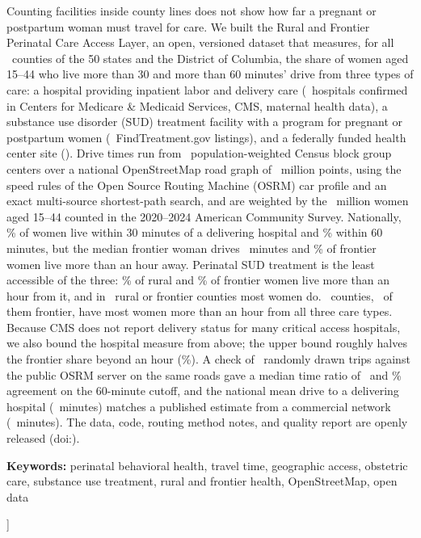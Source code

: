\documentclass[10pt,twocolumn,letterpaper]{article}
\begin{document}
\begin{@twocolumnfalse}
\begin{center}
\begin{minipage}{0.82\textwidth}
Counting facilities inside county lines does not show how far a pregnant or postpartum woman must travel for care. We built the Rural and Frontier Perinatal Care Access Layer, an open, versioned dataset that measures, for all \NCounties\ counties of the 50 states and the District of Columbia, the share of women aged 15--44 who live more than 30 and more than 60 minutes' drive from three types of care: a hospital providing inpatient labor and delivery care (\SitesOB\ hospitals confirmed in Centers for Medicare \& Medicaid Services, CMS, maternal health data), a substance use disorder (SUD) treatment facility with a program for pregnant or postpartum women (\SitesPPW\ FindTreatment.gov listings), and a federally funded health center site (\SitesHC). Drive times run from \NBG\ population-weighted Census block group centers over a national OpenStreetMap road graph of \Vertices\ million points, using the speed rules of the Open Source Routing Machine (OSRM) car profile and an exact multi-source shortest-path search, and are weighted by the \WomenMillions\ million women aged 15--44 counted in the 2020--2024 American Community Survey. Nationally, \OBWithinThirtyNat\% of women live within 30 minutes of a delivering hospital and \OBWithinSixtyNat\% within 60 minutes, but the median frontier woman drives \OBFrontierMedian\ minutes and \OBFrontierSixty\% of frontier women live more than an hour away. Perinatal SUD treatment is the least accessible of the three: \PPWRuralSixty\% of rural and \PPWFrontierSixty\% of frontier women live more than an hour from it, and in \RFMajSixtyPPW\ rural or frontier counties most women do. \AllThree\ counties, \AllThreeFrontier\ of them frontier, have most women more than an hour from all three care types. Because CMS does not report delivery status for many critical access hospitals, we also bound the hospital measure from above; the upper bound roughly halves the frontier share beyond an hour (\OBUFrontierSixty\%). A check of \ValN\ randomly drawn trips against the public OSRM server on the same roads gave a median time ratio of \ValRatio\ and \ValAgreeSixty\% agreement on the 60-minute cutoff, and the national mean drive to a delivering hospital (\OBMeanNat\ minutes) matches a published estimate from a commercial network (\FontenotMean\ minutes). The data, code, routing method notes, and quality report are openly released (doi:\DOI).\par
\vspace{4pt}
\noindent\textbf{Keywords:} perinatal behavioral health, travel time, geographic access, obstetric care, substance use treatment, rural and frontier health, OpenStreetMap, open data
\end{minipage}
\end{center}
\vspace{14pt}
\end{@twocolumnfalse}
]
{\renewcommand{\thefootnote}{$*$}}
\end{document}

